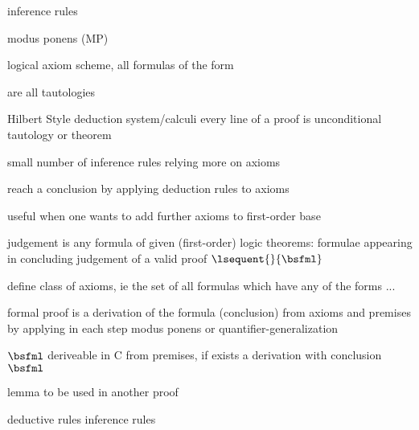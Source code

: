                 inference rules

                modus ponens (MP)

                logical axiom scheme, all formulas of the form

                \begin{calculus}
                    \cinferenceRule[L1|$\Lambda1$]{}{
                        \linferenceRule[impl]{(\asfml\limply(\bsfml\limply\csfml))}{(\asfml\limply\bsfml)\limply(\asfml\limply\csfml)}
                    }{}

                \end{calculus}

                are all tautologies

                Hilbert Style deduction system/calculi
                every line of a proof is unconditional tautology or theorem

                small number of inference rules
                relying more on axioms

                reach a conclusion by applying deduction rules to axioms

                useful when one wants to add further axioms to first-order base

                judgement is any formula of given (first-order) logic
                theorems: formulae appearing in concluding judgement of a valid proof $\lsequent{}{\bsfml}$

                define class of axioms, ie the set of all formulas which have any of the forms ...

                formal proof is a derivation of the formula (conclusion) from axioms and premises by applying in each step modus ponens or quantifier-generalization

                $\bsfml$ deriveable in C from premises, if exists a derivation with conclusion $\bsfml$

                lemma to be used in another proof

                deductive rules
                inference rules


